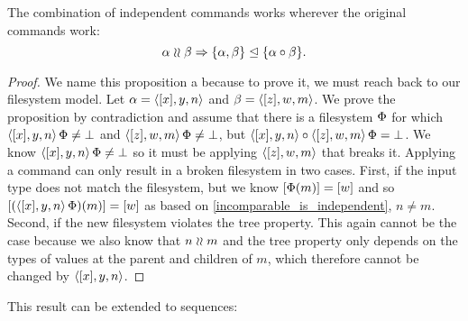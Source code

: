 \begin{myax}\label{combine_independent_commands}
The combination of independent commands works wherever the original commands work:
\[ \alpha\mathrel{\wr\wr} \beta \Rightarrow {\{\alpha, \beta\}}\trianglelefteq{\{\alpha\circ\beta\}}. \]
\end{myax}
\begin{proof}
We name this proposition a  
because to prove it, we must reach back to our filesystem model.
Let $\alpha=\langle{[x],y,n}\rangle$ and $\beta=\langle{[z],w,m}\rangle$.
We prove the proposition by contradiction and
assume that there is a filesystem $\Phi$ for which
$\langle{[x],y,n}\rangle\,\Phi\neq\bot$ and $\langle{[z],w,m}\rangle\,\Phi\neq\bot$, but
$\langle{[x],y,n}\rangle\circ \langle{[z],w,m}\rangle\,\Phi=\bot$.
We know $\langle{[x],y,n}\rangle\,\Phi\neq\bot$ so it must be applying 
$\langle{[z],w,m}\rangle$ that breaks it.
Applying a command can only result in a broken filesystem in two cases.
First, if the input type does not match the filesystem,
but we know $[\Phi(m)]=[w]$ and so
$[(\langle{[x],y,n}\rangle\,\Phi)(m)]=[w]$ as based on \cref{incomparable_is_independent}, $n\neq m$.
Second, if the new filesystem violates the tree property.
This again cannot be the case because we also know that $n\mathrel{\wr\wr} m$
and the tree property only depends on the types of values at the parent and children of $m$,
which therefore cannot be changed by $\langle{[x],y,n}\rangle$.
\end{proof}

This result can be extended to sequences:

